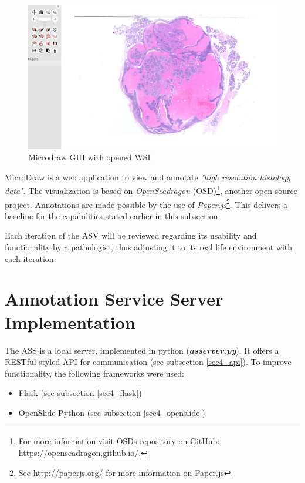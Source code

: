 \begin{figure}[H]
	\begin{center}
		\includegraphics[scale=0.2]{img/microdrawUI.png}
		\caption{Microdraw GUI with opened WSI}
		\label{fig4_microdrawUI}
	\end{center}
\end{figure}

MicroDraw is a web application to view and annotate \emph{"high resolution histology data"}\cite{web:microdraw2}. The visualization is based on \emph{OpenSeadragon} (OSD)\footnote{
	For more information visit OSDs repository on GitHub: \url{https://openseadragon.github.io/}.
}, another open source project. Annotations are made possible by the use of \emph{Paper.js}\footnote{See \url{http://paperjs.org/} for more information on Paper.js}. This delivers a baseline for the capabilities stated earlier in this subsection.

Each iteration of the ASV will be reviewed regarding its usability and functionality by a pathologist, thus adjusting it to its real life environment with each iteration.


\section{Annotation Service Server Implementation}
The ASS is a local server, implemented in python (\emph{\textbf{as{\textunderscore}server.py}}). It offers a RESTful styled API for communication (see subsection \ref{sec4_api}). To improve functionality, the following frameworks were used:

\begin{itemize}
	\item Flask (see subsection \ref{sec4_flask})
	\item OpenSlide Python (see subsection \ref{sec4_openslide})
\end{itemize}


